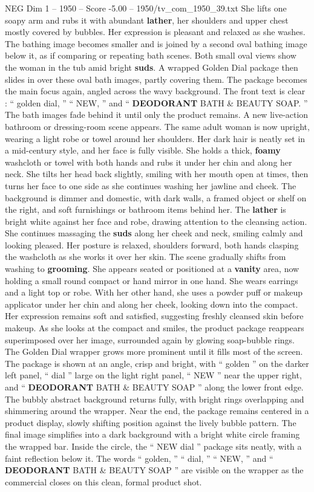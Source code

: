\begin{textsample}{NEG Dim 1 – 1950 – Score -5.00 – 1950/tv\_com\_1950\_39.txt}
She lifts one soapy arm and rubs it with abundant \textbf{lather}, her shoulders and upper chest mostly covered by bubbles.
Her expression is pleasant and relaxed as she washes.
The bathing image becomes smaller and is joined by a second oval bathing image below it, as if comparing or repeating bath scenes.
Both small oval views show the woman in the tub amid bright \textbf{suds}.
A wrapped Golden Dial package then slides in over these oval bath images, partly covering them.
The package becomes the main focus again, angled across the wavy background.
The front text is clear : “ golden dial, ” “ NEW, ” and “ \textbf{DEODORANT} BATH \& BEAUTY SOAP. ” The bath images fade behind it until only the product remains.
A new live-action bathroom or dressing-room scene appears.
The same adult woman is now upright, wearing a light robe or towel around her shoulders.
Her dark hair is neatly set in a mid-century style, and her face is fully visible.
She holds a thick, \textbf{foamy} washcloth or towel with both hands and rubs it under her chin and along her neck.
She tilts her head back slightly, smiling with her mouth open at times, then turns her face to one side as she continues washing her jawline and cheek.
The background is dimmer and domestic, with dark walls, a framed object or shelf on the right, and soft furnishings or bathroom items behind her.
The \textbf{lather} is bright white against her face and robe, drawing attention to the cleansing action.
She continues massaging the \textbf{suds} along her cheek and neck, smiling calmly and looking pleased.
Her posture is relaxed, shoulders forward, both hands clasping the washcloth as she works it over her skin.
The scene gradually shifts from washing to \textbf{grooming}.
She appears seated or positioned at a \textbf{vanity} area, now holding a small round compact or hand mirror in one hand.
She wears earrings and a light top or robe.
With her other hand, she uses a powder puff or makeup applicator under her chin and along her cheek, looking down into the compact.
Her expression remains soft and satisfied, suggesting freshly cleansed skin before makeup.
As she looks at the compact and smiles, the product package reappears superimposed over her image, surrounded again by glowing soap-bubble rings.
The Golden Dial wrapper grows more prominent until it fills most of the screen.
The package is shown at an angle, crisp and bright, with “ golden ” on the darker left panel, “ dial ” large on the light right panel, “ NEW ” near the upper right, and “ \textbf{DEODORANT} BATH \& BEAUTY SOAP ” along the lower front edge.
The bubbly abstract background returns fully, with bright rings overlapping and shimmering around the wrapper.
Near the end, the package remains centered in a product display, slowly shifting position against the lively bubble pattern.
The final image simplifies into a dark background with a bright white circle framing the wrapped bar.
Inside the circle, the “ NEW dial ” package sits neatly, with a faint reflection below it.
The words “ golden, ” “ dial, ” “ NEW, ” and “ \textbf{DEODORANT} BATH \& BEAUTY SOAP ” are visible on the wrapper as the commercial closes on this clean, formal product shot.

\end{textsample}
